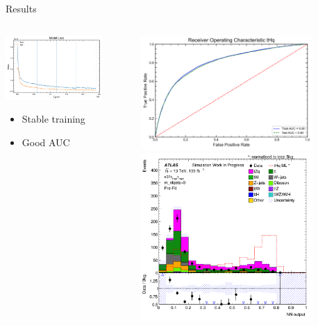 \begin{frame}{Results}
    \begin{columns}
        \begin{column}{0.5\textwidth}
          \includegraphics[width=0.8\textwidth]{losses_cat}
          \begin{itemize}
            \item Stable training
            \item Good AUC
          \end{itemize}
        \end{column}
        \begin{column}{0.5\textwidth}
          \includegraphics[width=0.8\textwidth]{ROC_cat}
          \includegraphics[width=0.8\textwidth]{response_cat}
        \end{column}
    \end{columns}    
\end{frame}


